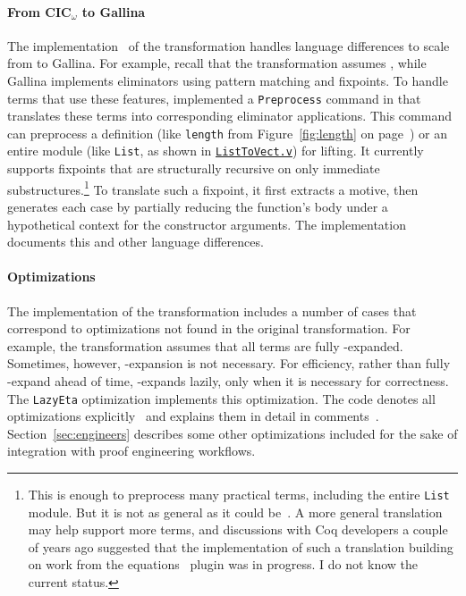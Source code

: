 \paragraph{From CIC$_{\omega}$ to Gallina}
The implementation~\href{https://github.com/uwplse/pumpkin-pi/blob/v2.0.0/plugin/src/automation/lift/lift.ml}{} %
of the transformation handles language differences to scale from  to Gallina.
For example, recall that the transformation assumes , while Gallina implements eliminators using pattern matching and fixpoints. 
To handle terms that use these features,  implemented a \lstinline{Preprocess} command in \toolnamec that 
translates these terms into corresponding eliminator applications.
This command can preprocess a definition (like \lstinline{length} from Figure~\ref{fig:length} on page~\pageref{fig:length}) or an entire module
(like \lstinline{List}, as shown in \href{http://github.com/uwplse/ornamental-search/blob/itp+equiv/plugin/coq/examples/ListToVect.v}{\lstinline{ListToVect.v}}) for lifting. %
It currently supports fixpoints that are structurally recursive on only 
immediate substructures.\footnote{This is enough to preprocess many practical terms, including the entire \lstinline{List} module.
But it is not as general as it could be~\cite{recursion-elimination, jesper}.
A more general translation may help \toolnamec support more terms, and discussions
with Coq developers a couple of years ago suggested that the implementation of such a translation
building on work from the equations~\cite{sozeau:equations} plugin was in progress.
I do not know the current status.}
To translate such a fixpoint, it first extracts a motive, then generates each case
by partially reducing the function's body under a hypothetical context for the constructor arguments.
The implementation documents this and other language differences.

\paragraph{Optimizations}
The implementation of the transformation includes a number of cases that correspond to optimizations
not found in the original transformation.
For example, the transformation assumes that all terms are fully \smallmath{$\eta$}-expanded. Sometimes,
however, \smallmath{$\eta$}-expansion is not necessary.
For efficiency, rather than fully \smallmath{$\eta$}-expand ahead of time, \toolnamec \smallmath{$\eta$}-expands lazily, 
only when it is necessary for correctness.
The \lstinline{LazyEta} optimization implements this optimization.
The code denotes all optimizations explicitly~\href{https://github.com/uwplse/pumpkin-pi/blob/v2.0.0/plugin/src/automation/lift/lift.ml}{}
and explains them in detail in comments~\href{https://github.com/uwplse/pumpkin-pi/blob/v2.0.0/plugin/src/automation/lift/liftrules.ml}{}.
Section~\ref{sec:engineers} describes some other optimizations included for the sake of integration with proof engineering workflows.

